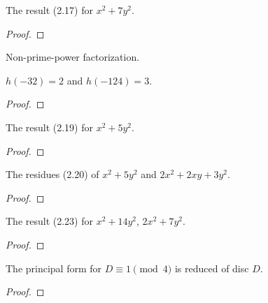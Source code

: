 \begin{theorem}[Exercise 2.11]
  \label{exr:s2_11}
  \leanok
  The result (2.17) for $x^2+7y^2$.
\end{theorem}
\begin{proof}\end{proof}

\begin{theorem}[Exercise 2.12(a)]
  \label{exr:s2_12_a}
  \leanok
  Non-prime-power factorization.
\end{theorem}

\begin{theorem}[Exercise 2.12(b)]
  \label{exr:s2_12_b}
  \leanok
  $h(-32)=2$ and $h(-124)=3$.
\end{theorem}
\begin{proof}\end{proof}

\begin{theorem}[Exercise 2.13]
  \label{exr:s2_13}
  \leanok
  The result (2.19) for $x^2+5y^2$.
\end{theorem}
\begin{proof}\end{proof}

\begin{theorem}[Exercise 2.14]
  \label{exr:s2_14}
  \leanok
  The residues (2.20) of $x^2+5y^2$ and $2x^2+2xy+3y^2$.
\end{theorem}
\begin{proof}\end{proof}

\begin{theorem}[Exercise 2.15]
  \label{exr:s2_15}
  \leanok
  The result (2.23) for $x^2+14y^2$, $2x^2+7y^2$.
\end{theorem}
\begin{proof}\end{proof}

\begin{theorem}[Exercise 2.16]
  \label{exr:s2_16}
  \leanok
  The principal form for $D \equiv 1 \pmod 4$ is reduced of disc $D$.
\end{theorem}
\begin{proof}\end{proof}

